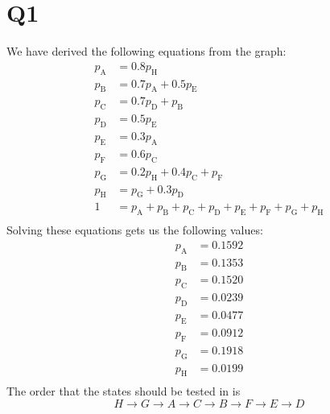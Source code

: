 \documentclass[12pt, letterpaper, titlepage]{article}
\begin{document}
 
\singlespacing

\section{Q1}
We have derived the following equations from the graph:
\begin{align}
    p_\text{A} &= 0.8p_\text{H} \\
    p_\text{B} &= 0.7p_\text{A} + 0.5p_\text{E} \\
    p_\text{C} &= 0.7 p_\text{D} + p_\text{B} \\
    p_\text{D} &= 0.5p_\text{E} \\
    p_\text{E} &= 0.3p_\text{A} \\
    p_\text{F} &= 0.6p_\text{C} \\
    p_\text{G} &= 0.2p_\text{H} + 0.4p_\text{C} + p_\text{F} \\
    p_\text{H} &= p_\text{G} + 0.3p_\text{D} \\ 
    1 &= p_\text{A} + p_\text{B} + p_\text{C} + p_\text{D} + p_\text{E} + p_\text{F} + p_\text{G} + p_\text{H} \\
\end{align}
Solving these equations gets us the following values:
\begin{align}
    p_\text{A} &= 0.1592 \\
    p_\text{B} &= 0.1353 \\
    p_\text{C} &= 0.1520 \\
    p_\text{D} &= 0.0239 \\
    p_\text{E} &= 0.0477 \\
    p_\text{F} &= 0.0912 \\
    p_\text{G} &= 0.1918 \\
    p_\text{H} &= 0.0199 \\
\end{align}
The order that the states should be tested in is
\begin{equation}
    H \rightarrow G \rightarrow A \rightarrow C \rightarrow B \rightarrow F \rightarrow E \rightarrow D
\end{equation}
\end{document}
